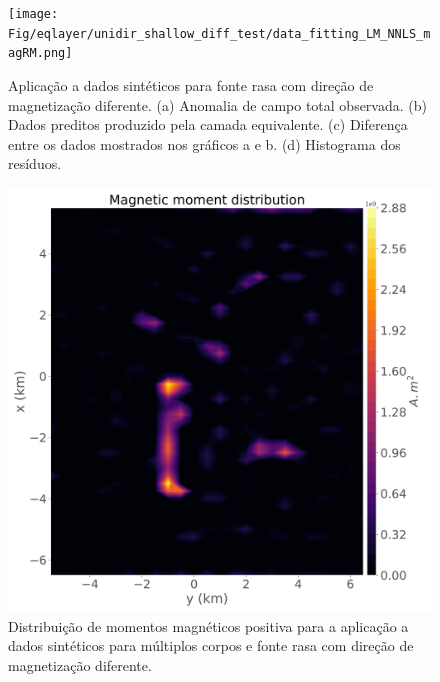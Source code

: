 \begin{figure}
	\centering
	\texttt{[image: Fig/eqlayer/unidir\_shallow\_diff\_test/data\_fitting\_LM\_NNLS\_magRM.png]}
	\caption{Aplicação a dados sintéticos para fonte rasa com direção de magnetização diferente. (a) Anomalia de campo total observada. (b) Dados preditos produzido pela camada equivalente. (c) Diferença entre os dados mostrados nos gráficos a e b. (d) Histograma dos resíduos.}
	\label{fig:data_fitting_3}
\end{figure}

\begin{figure}
	\centering
	\includegraphics[width=.9\textwidth]{Fig/eqlayer/unidir_shallow_diff_test/magnetic_moment_positive_LM_NNLS_magRM.png}
	\caption{Distribuição de momentos magnéticos positiva para a aplicação a dados sintéticos para múltiplos corpos e fonte rasa com direção de magnetização diferente.}
	\label{fig:dist_momentos_pos_3}
\end{figure}

